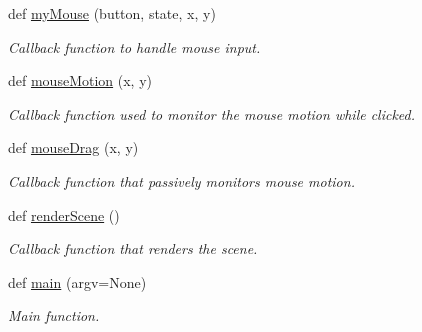 \begin{DoxyCompactItemize}
def \hyperlink{namespacemain_a0f7b954a9ec1b9e21e5d888e630d1ed0}{my\+Mouse} (button, state, x, y)
\begin{DoxyCompactList}\small\item\em Callback function to handle mouse input. \end{DoxyCompactList}\item 
def \hyperlink{namespacemain_aac29b4e8c9fa3c64c062e76290492fb8}{mouse\+Motion} (x, y)
\begin{DoxyCompactList}\small\item\em Callback function used to monitor the mouse motion while clicked. \end{DoxyCompactList}\item 
def \hyperlink{namespacemain_a33eac5e1e174927a801f847ff8c2d484}{mouse\+Drag} (x, y)
\begin{DoxyCompactList}\small\item\em Callback function that passively monitors mouse motion. \end{DoxyCompactList}\item 
\mbox{\label{namespacemain_a9258848a9cd7db8568ec88c7846c4768}} 
def \hyperlink{namespacemain_a9258848a9cd7db8568ec88c7846c4768}{render\+Scene} ()
\begin{DoxyCompactList}\small\item\em Callback function that renders the scene. \end{DoxyCompactList}\item 
\mbox{\label{namespacemain_a23a088b39943d6376eeea956b0afbd48}} 
def \hyperlink{namespacemain_a23a088b39943d6376eeea956b0afbd48}{main} (argv=None)
\begin{DoxyCompactList}\small\item\em Main function. \end{DoxyCompactList}\end{DoxyCompactItemize}
